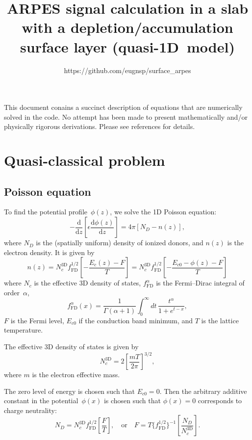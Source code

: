 \documentclass[10pt]{article}
\newcommand{\dd}{\mathrm{d}}
\newcommand{\fFD}{f_{\mathrm{FD}}}
\begin{document}
\title{ARPES signal calculation in a slab with a depletion/accumulation
surface layer (quasi-1D~model)}
\author{https://github.com/eugnsp/surface\_arpes}
\maketitle

This document conains a succinct description of equations that are numerically solved
in the code. No attempt has been made to present mathematically and/or physically
rigorous derivations. Please see references for details.

\section{Quasi-classical problem}

\subsection{Poisson equation}

To find the potential profile~$\phi(z)$, we solve the 1D Poisson equation:
\begin{equation}
	\label{eq:poisson}
	- \frac{\dd}{\dd z} \left[ \epsilon \frac{\dd\phi(z)}{\dd z} \right]
	= 4\pi [N_D - n(z)],
\end{equation}
where $N_D$ is the (spatially uniform) density of ionized donors, and $n(z)$ is the
electron density. It is given by
\begin{equation}
	\label{eq:c_density}
	n(z) = N_c^\mathrm{3D} \fFD^{1/2} \left[ -\frac{E_c(z) - F}{T} \right]
	     = N_c^\mathrm{3D} \fFD^{1/2} \left[ -\frac{E_{c0} - \phi(z) - F}{T} \right]
\end{equation}
where $N_c$ is the effective 3D density of states, $\fFD^{\alpha}$ is the Fermi--Dirac
integral of order~$\alpha$,
\begin{equation}
	\fFD^{\alpha}(x) =
	\frac{1}{\Gamma(\alpha + 1)} \int_0^\infty dt\, \frac{t^\alpha}{1 + e^{t - x}},
\end{equation}
$F$ is the Fermi level, $E_{c0}$ if the conduction band minimum,
and $T$ is the lattice temperature.

The effective 3D density of states is given by
\begin{equation}
	N_c^\mathrm{3D} = 2 \left[ \frac{m T}{2\pi} \right]^{3/2},
\end{equation}
where $m$ is the electron effective mass.

The zero level of energy is chosen such that $E_{c0} = 0$. Then the arbitrary additive
constant in the potential~$\phi(x)$ is chosen such that $\phi(x) = 0$ corresponds to
charge neutrality:
\begin{equation}
	N_D = N_c^\mathrm{3D} \fFD^{1/2} \left[ \frac{F}{T} \right],
	\quad\text{or}\quad
	F = T \{\fFD^{1/2}\}^{-1} \left[ \frac{N_D}{N_c^\mathrm{3D}} \right].
\end{equation}
\end{document}
